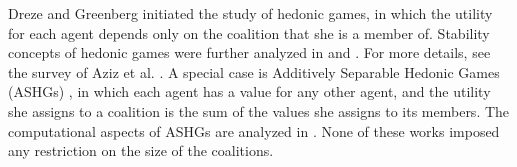 \documentclass[sigconf,anonymous]{aamas}
\begin{document}
Dreze and Greenberg \cite{dreze1980hedonic} initiated the study of hedonic games,
in which the utility for each agent depends only on the coalition that she is a member of. Stability concepts of hedonic games were further analyzed in \cite{banerjee2001core} and \cite{cechlarova2001stability}. For more details, see the survey of Aziz et al. \cite{aziz2016hedonic}.
A special case is Additively Separable Hedonic Games (ASHGs) \cite{bogomolnaia2002stability}, in which each agent has a value for any other agent, and the utility she assigns to a coalition is the sum of the values she assigns to its members. The computational aspects of ASHGs are analyzed in \cite{deng1994complexity,ballester2004np,olsen2009nash,sung2010computational,aziz2013computing,Bachrach2013,bilo2019optimality}. %
None of these works imposed any restriction on the size of the coalitions.
\end{document}
